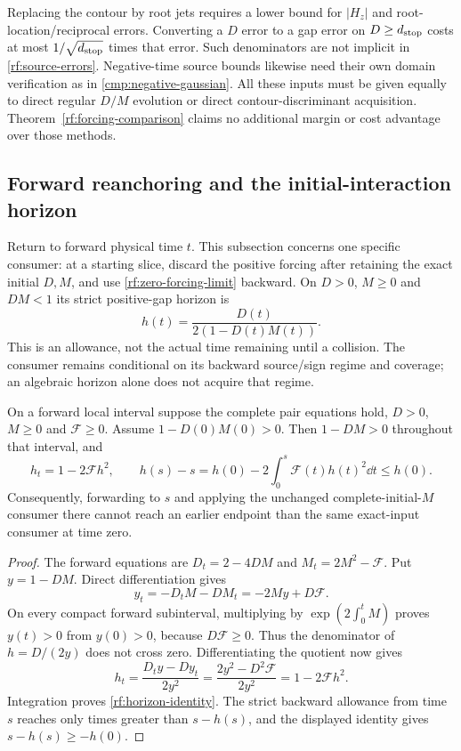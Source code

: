 Replacing the contour by root jets requires a lower bound for $|H_z|$
and root-location/reciprocal errors. Converting a $D$ error to a gap error
on $D\ge d_{\rm stop}$ costs at most $1/\sqrt{d_{\rm stop}}$ times
that error. Such denominators are not implicit in
\eqref{rf:source-errors}. Negative-time source bounds likewise need
their own domain verification as in \eqref{cmp:negative-gaussian}.
All these inputs must be given equally to direct regular $D/M$ evolution
or direct contour-discriminant acquisition. Theorem~\ref{rf:forcing-comparison}
claims no additional margin or cost advantage over those methods.

\subsection{Forward reanchoring and the initial-interaction horizon}

Return to forward physical time $t$. This subsection concerns one
specific consumer: at a starting slice, discard the positive forcing
after retaining the exact initial $D,M$, and use
\eqref{rf:zero-forcing-limit} backward. On $D>0$, $M\ge0$ and $DM<1$
its strict positive-gap horizon is
\begin{equation}
 h(t)=\frac{D(t)}{2(1-D(t)M(t))}.
 \label{rf:horizon-definition}
\end{equation}
This is an allowance, not the actual time remaining until a collision.
The consumer remains conditional on its backward source/sign regime and
coverage; an algebraic horizon alone does not acquire that regime.

\begin{theorem}
\label{rf:horizon}
On a forward local interval suppose the complete pair equations hold,
$D>0$, $M\ge0$ and $\mathcal F\ge0$. Assume $1-D(0)M(0)>0$.
Then $1-DM>0$ throughout that interval, and
\begin{equation}
 h_t=1-2\mathcal Fh^2,\qquad
 h(s)-s=h(0)-2\int_0^s\mathcal F(t)h(t)^2\dd t\le h(0).
 \label{rf:horizon-identity}
\end{equation}
Consequently, forwarding to $s$ and applying the unchanged
complete-initial-$M$ consumer there cannot reach an earlier endpoint
than the same exact-input consumer at time zero.
\end{theorem}

\begin{proof}
The forward equations are $D_t=2-4DM$ and
$M_t=2M^2-\mathcal F$. Put $y=1-DM$. Direct differentiation gives
\[
 y_t=-D_tM-DM_t=-2My+D\mathcal F.
\]
On every compact forward subinterval, multiplying by
$\exp(2\int_0^tM)$ proves $y(t)>0$ from $y(0)>0$, because
$D\mathcal F\ge0$. Thus the denominator of $h=D/(2y)$ does not
cross zero. Differentiating the quotient now gives
\[
 h_t=\frac{D_ty-Dy_t}{2y^2}
     =\frac{2y^2-D^2\mathcal F}{2y^2}
     =1-2\mathcal Fh^2.
\]
Integration proves \eqref{rf:horizon-identity}. The strict backward
allowance from time $s$ reaches only times greater than $s-h(s)$,
and the displayed identity gives $s-h(s)\ge-h(0)$.
\end{proof}

